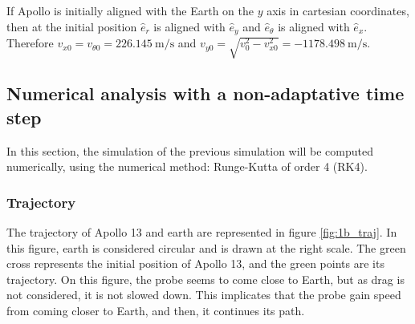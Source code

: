 \documentclass[a4paper,12pt,twoside]{article}
\begin{document}
If Apollo is initially aligned with the Earth on the $y$ axis in cartesian coordinates, then at the initial position $\hat{e}_r$ is aligned with $\hat{e}_y$ and $\hat{e}_\theta$ is aligned with $\hat{e}_x$. Therefore $v_{x0} = v_{\theta 0} = 226.145~\si{\m \per \s}$ and $v_{y0} = \sqrt{v_0^2 - v_{x0}^2} = -1178.498~\si{\m \per \s}$.


%




\subsection{Numerical analysis with a non-adaptative time step}
In this section, the simulation of the previous simulation will be computed numerically, using the numerical method: Runge-Kutta of order 4 (RK4).

\subsubsection{Trajectory}\label{sec:1b_traj}
The trajectory of Apollo 13 and earth are represented in figure \ref{fig:1b_traj}.
In this figure, earth is considered circular and is drawn at the right scale.
The green cross represents the initial position of Apollo 13, and the green points are its trajectory.
On this figure, the probe seems to come close to Earth, but as drag is not considered, it is not slowed down.
This implicates that the probe gain speed from coming closer to Earth, and then, it continues its path.
\end{document}
